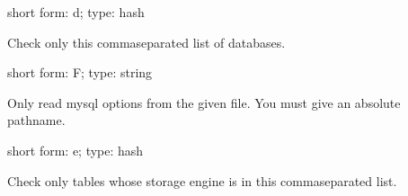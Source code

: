 \documentclass[letterpaper,10pt,english]{sphinxmanual}
\begin{document}
\begin{fulllineitems}
\label{\detokenize{mariadb-index-checker:cmdoption-mariadb-index-checker-databases}}
\sphinxAtStartPar
short form: \sphinxhyphen{}d; type: hash

\sphinxAtStartPar
Check only this comma\sphinxhyphen{}separated list of databases.

\end{fulllineitems}


\begin{fulllineitems}
\label{\detokenize{mariadb-index-checker:cmdoption-mariadb-index-checker-defaults-file}}
\sphinxAtStartPar
short form: \sphinxhyphen{}F; type: string

\sphinxAtStartPar
Only read mysql options from the given file.  You must give an absolute pathname.

\end{fulllineitems}


\begin{fulllineitems}
\label{\detokenize{mariadb-index-checker:cmdoption-mariadb-index-checker-engines}}
\sphinxAtStartPar
short form: \sphinxhyphen{}e; type: hash

\sphinxAtStartPar
Check only tables whose storage engine is in this comma\sphinxhyphen{}separated list.

\end{fulllineitems}
\end{document}
